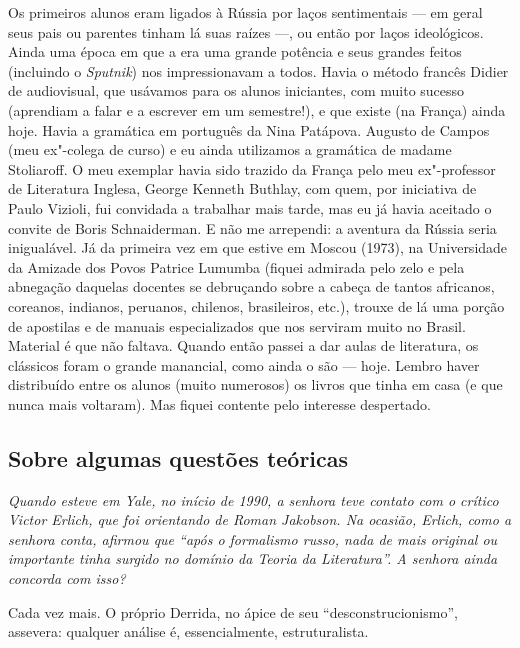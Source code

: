 Os primeiros alunos eram ligados à Rússia por laços sentimentais --- em
geral seus pais ou parentes tinham lá suas raízes ---, ou então por laços
ideológicos. Ainda uma época em que a  era uma grande potência e
seus grandes feitos (incluindo o \emph{Sputnik}) nos impressionavam a
todos. Havia o método francês Didier de audiovisual, que usávamos para
os alunos iniciantes, com muito sucesso (aprendiam a falar e a escrever
em um semestre!), e que existe (na França) ainda hoje. Havia a gramática
em português da Nina Patápova. Augusto de Campos (meu ex"-colega de
curso) e eu ainda utilizamos a gramática de madame Stoliaroff. O meu
exemplar havia sido trazido da França pelo meu ex"-professor de
Literatura Inglesa, George Kenneth Buthlay, com quem, por iniciativa de
Paulo Vizioli, fui convidada a trabalhar mais tarde, mas eu já havia
aceitado o convite de Boris Schnaiderman. E não me arrependi: a aventura
da Rússia seria inigualável. Já da primeira vez em que estive em Moscou
(1973), na Universidade da Amizade dos Povos Patrice Lumumba (fiquei
admirada pelo zelo e pela abnegação daquelas docentes se debruçando
sobre a cabeça de tantos africanos, coreanos, indianos, peruanos,
chilenos, brasileiros, etc.), trouxe de lá uma porção de apostilas e de
manuais especializados que nos serviram muito no Brasil. Material é que
não faltava. Quando então passei a dar aulas de literatura, os clássicos
foram o grande manancial, como ainda o são --- hoje. Lembro haver
distribuído entre os alunos (muito numerosos) os livros que tinha em
casa (e que nunca mais voltaram). Mas fiquei contente pelo interesse
despertado.

\subsection{\uppercase{S}obre algumas questões teóricas}

\emph{Quando esteve em Yale, no início de 1990, a senhora teve contato
com o crítico Victor Erlich, que foi orientando de Roman Jakobson. Na
ocasião, Erlich, como a senhora conta, afirmou que ``após o formalismo
russo, nada de mais original ou importante tinha surgido no domínio da
Teoria da Literatura''. A senhora ainda concorda com isso?}

Cada vez mais. O próprio Derrida, no ápice de seu
``desconstrucionismo'', assevera: qualquer análise é, essencialmente,
estruturalista.


